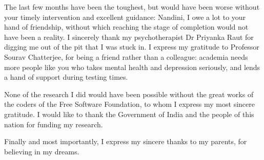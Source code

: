 The last few months have been the toughest, but would have been worse without your timely intervention and excellent guidance: Nandini, I owe a lot to your hand of friendship, without which reaching the stage of completion would not have been a reality. I sincerely thank my psychotherapist Dr Priyanka Raut for digging me out of the pit that I was stuck in. I express my gratitude to Professor Sourav Chatterjee, for being a friend rather than a colleague: academia needs more people like you who takes mental health and depression seriously, and lends a hand of support during testing times.

None of the research I did would have been possible without the great works of the coders of the Free Software Foundation, to whom I express my most sincere gratitude. I would like to thank the Government of India and the people of this nation for funding my research.

Finally and most importantly, I express my sincere thanks to my parents, for believing in my dreams.